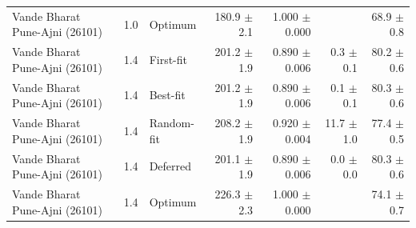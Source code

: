 \begin{tabular}{lllrrrr}
Vande Bharat Pune-Ajni (26101) & 1.0 & Optimum & 180.9 $\pm$ 2.1 & 1.000 $\pm$ 0.000 &  & 68.9 $\pm$ 0.8 \\
Vande Bharat Pune-Ajni (26101) & 1.4 & First-fit & 201.2 $\pm$ 1.9 & 0.890 $\pm$ 0.006 & 0.3 $\pm$ 0.1 & 80.2 $\pm$ 0.6 \\
Vande Bharat Pune-Ajni (26101) & 1.4 & Best-fit & 201.2 $\pm$ 1.9 & 0.890 $\pm$ 0.006 & 0.1 $\pm$ 0.1 & 80.3 $\pm$ 0.6 \\
Vande Bharat Pune-Ajni (26101) & 1.4 & Random-fit & 208.2 $\pm$ 1.9 & 0.920 $\pm$ 0.004 & 11.7 $\pm$ 1.0 & 77.4 $\pm$ 0.5 \\
Vande Bharat Pune-Ajni (26101) & 1.4 & Deferred & 201.1 $\pm$ 1.9 & 0.890 $\pm$ 0.006 & 0.0 $\pm$ 0.0 & 80.3 $\pm$ 0.6 \\
Vande Bharat Pune-Ajni (26101) & 1.4 & Optimum & 226.3 $\pm$ 2.3 & 1.000 $\pm$ 0.000 &  & 74.1 $\pm$ 0.7 \\
\hline
\end{tabular}
